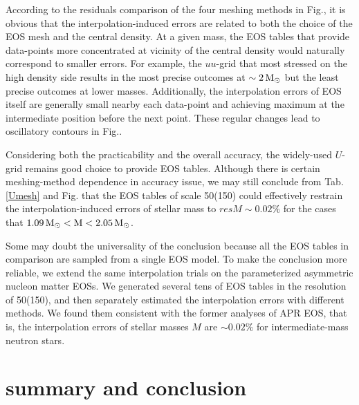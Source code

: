 \documentclass[preprint,tightenlines,eqsecnum,floats,aps,amsmath,amssymb,nofootinbib,prd,showpacs]{revtex4}
\begin{document}

According to the residuals comparison of the four meshing methods in Fig., it is obvious that the interpolation-induced errors are related to both the choice of the EOS mesh and the central density. At a given mass, the EOS tables that provide data-points more concentrated at vicinity of the central density would naturally correspond to smaller errors. For example, the $uu$-grid that most stressed on the high density side results in the most precise outcomes at $\sim 2 \, \rm{M}_{\odot}$ but the least precise outcomes at lower masses. Additionally, the interpolation errors of EOS itself are generally small nearby each data-point and achieving maximum at the intermediate position before the next point. These regular changes lead to oscillatory contours in Fig..

Considering both the practicability and the overall accuracy, the widely-used $U$-grid remains good choice to provide EOS tables. Although there is certain meshing-method dependence in accuracy issue, we may still conclude from Tab.$\,$\ref{Umesh} and Fig. that the EOS tables of scale 50(150) could effectively restrain the interpolation-induced errors of stellar mass to $resM\sim 0.02\%$ for the cases that $1.09 \, \rm{M}_{\odot}<M<2.05 \, \rm{M}_{\odot}$.

Some may doubt the universality of the conclusion because all the EOS tables in comparison are sampled from a single EOS model. To make the conclusion more reliable, we extend the same interpolation trials on the parameterized asymmetric nucleon matter EOSs. We generated several tens of EOS tables in the resolution of 50(150), and then separately estimated the interpolation errors with different methods. We found them consistent with the former analyses of APR EOS, that is, the interpolation errors of stellar masses $M$ are $\sim 0.02\%$ for intermediate-mass neutron stars.


\section{summary and conclusion}
\end{document}
